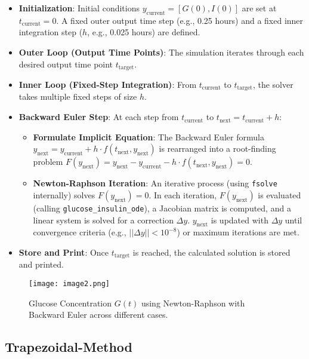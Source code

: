 \documentclass[conference]{IEEEtran}
\begin{document}
\begin{itemize}
    \item \textbf{Initialization}: Initial conditions $y_{\text{current}} = [G(0), I(0)]$ are set at $t_{\text{current}} = 0$. A fixed outer output time step (e.g., 0.25 hours) and a fixed inner integration step ($h$, e.g., 0.025 hours) are defined.
    \item \textbf{Outer Loop (Output Time Points)}: The simulation iterates through each desired output time point $t_{\text{target}}$.
    \item \textbf{Inner Loop (Fixed-Step Integration)}: From $t_{\text{current}}$ to $t_{\text{target}}$, the solver takes multiple fixed steps of size $h$.
    \item \textbf{Backward Euler Step}: At each step from $t_{\text{current}}$ to $t_{\text{next}} = t_{\text{current}} + h$:
    \begin{itemize}
        \item \textbf{Formulate Implicit Equation}: The Backward Euler formula $y_{\text{next}} = y_{\text{current}} + h \cdot f(t_{\text{next}}, y_{\text{next}})$ is rearranged into a root-finding problem $F(y_{\text{next}}) = y_{\text{next}} - y_{\text{current}} - h \cdot f(t_{\text{next}}, y_{\text{next}}) = 0$.
        \item \textbf{Newton-Raphson Iteration}: An iterative process (using \texttt{fsolve} internally) solves $F(y_{\text{next}})=0$. In each iteration, $F(y_{\text{next}})$ is evaluated (calling \texttt{glucose\_insulin\_ode}), a Jacobian matrix is computed, and a linear system is solved for a correction $\Delta y$. $y_{\text{next}}$ is updated with $\Delta y$ until convergence criteria (e.g., $||\Delta y|| < 10^{-8}$) or maximum iterations are met.
    \end{itemize}
    \item \textbf{Store and Print}: Once $t_{\text{target}}$ is reached, the calculated solution is stored and printed.
\end{itemize}
\begin{figure}[H]
    \centering
    \texttt{[image: image2.png]} 
    \caption{Glucose Concentration $G(t)$ using Newton-Raphson with Backward Euler across different cases.}
    \label{fig:be_glucose}
\end{figure}



\subsection{Trapezoidal-Method}
\end{document}
